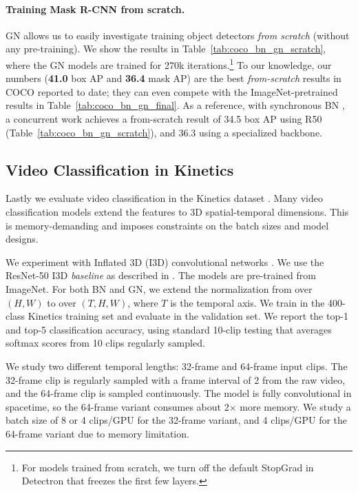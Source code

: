 \documentclass[10pt,twocolumn,letterpaper]{article}
\begin{document}
\paragraph{Training Mask R-CNN from scratch.} GN allows us to easily investigate training object detectors \emph{from scratch} (without any pre-training). We show the results in Table~\ref{tab:coco_bn_gn_scratch}, where the GN models are trained for 270k iterations.\footnote{For models trained from scratch, we turn off the default StopGrad in Detectron that freezes the first few layers.}
To our knowledge, our numbers (\textbf{41.0} box AP and \textbf{36.4} mask AP) are the best \emph{from-scratch} results in COCO reported to date; they can even compete with the ImageNet-pretrained results in Table~\ref{tab:coco_bn_gn_final}.
As a reference, with synchronous BN \cite{Peng2018}, a concurrent work \cite{Li2018} achieves a from-scratch result of 34.5 box AP using R50 (Table~\ref{tab:coco_bn_gn_scratch}), and 36.3 using a specialized backbone.

\subsection{Video Classification in Kinetics}

Lastly we evaluate video classification in the Kinetics dataset \cite{Kay2017}. Many video classification models \cite{Tran2015,Carreira2017} extend the features to 3D spatial-temporal dimensions. This is memory-demanding and imposes constraints on the batch sizes and model designs.

We experiment with Inflated 3D (I3D) convolutional networks \cite{Carreira2017}.
We use the ResNet-50 I3D \emph{baseline} as described in \cite{Wang2018}.
The models are pre-trained from ImageNet.
For both BN and GN, we extend the normalization from over $(H, W)$ to over $(T, H, W)$, where $T$ is the temporal axis. We train in the 400-class Kinetics training set and evaluate in the validation set. We report the top-1 and top-5 classification accuracy, using standard 10-clip testing that averages softmax scores from 10 clips regularly sampled.

We study two different temporal lengths: 32-frame and 64-frame input clips. The 32-frame clip is regularly sampled with a frame interval of 2 from the raw video, and the 64-frame clip is sampled continuously. The model is fully convolutional in spacetime, so the 64-frame variant consumes about 2$\times$ more memory. We study a batch size of 8 or 4 clips/GPU for the 32-frame variant, and 4 clips/GPU for the 64-frame variant due to memory limitation.
\end{document}
